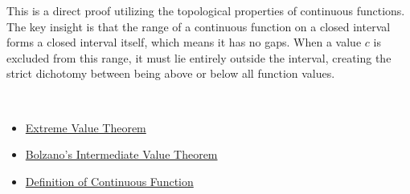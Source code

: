 \begin{remark*}
This is a direct proof utilizing the topological properties of continuous functions. The key insight is that the range of a continuous function on a closed interval forms a closed interval itself, which means it has no gaps. When a value $c$ is excluded from this range, it must lie entirely outside the interval, creating the strict dichotomy between being above or below all function values.
\end{remark*}

\begin{remark*}[Dependencies]~\\
\begin{itemize}
  \item \hyperref[thm:extreme-value-theorem]{Extreme Value Theorem}
  \item \hyperref[thm:bolzano-intermediate-value]{Bolzano's Intermediate Value Theorem}
  \item \hyperref[def:continuous-function]{Definition of Continuous Function}
\end{itemize}
\end{remark*}

\clearpage

